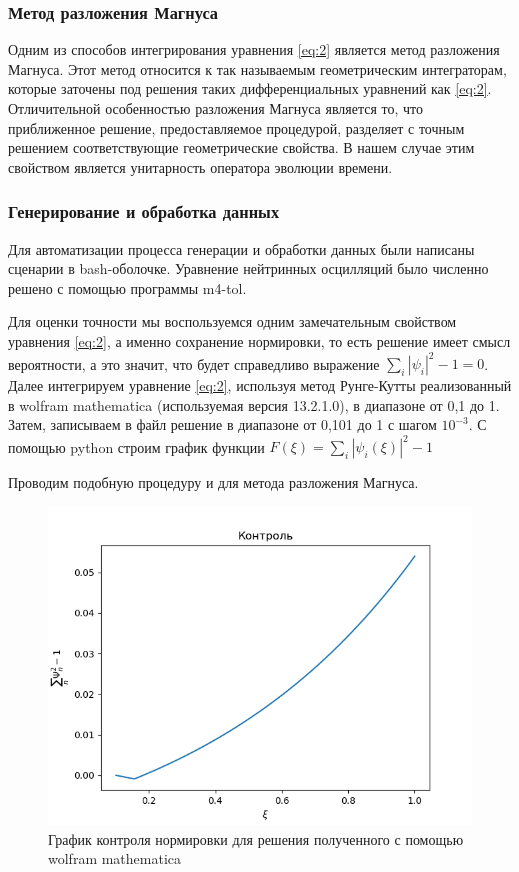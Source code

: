 \documentclass[utf8,9pt,mathserif,usepdftitle=false]{beamer}
\begin{document}
\begin{frame}
	\frametitle{Метод разложения Магнуса}
	Одним из способов интегрирования уравнения \eqref{eq:2} является метод разложения Магнуса. Этот метод относится к так называемым геометрическим интеграторам, которые заточены под решения таких дифференциальных уравнений как \eqref{eq:2}. Отличительной особенностью разложения Магнуса является то, что приближенное решение, предоставляемое процедурой, разделяет с точным решением соответствующие геометрические свойства. В нашем случае этим свойством является унитарность оператора эволюции времени. 
\end{frame}

\begin{frame}
	\frametitle{Генерирование и обработка данных}
	Для автоматизации процесса генерации и обработки данных были написаны сценарии в bash-оболочке. Уравнение нейтринных осцилляций было численно решено с помощью программы m4-tol. 
	
	Для оценки точности мы воспользуемся одним замечательным свойством уравнения \eqref{eq:2}, а именно сохранение нормировки, то есть решение имеет смысл вероятности, а это значит, что будет справедливо выражение \(\sum_{i}|\psi_{i}|^{2}-1=0\). Далее интегрируем уравнение \eqref{eq:2}, используя метод Рунге-Кутты реализованный в wolfram mathematica (используемая версия 13.2.1.0), в диапазоне от 0,1 до 1. Затем, записываем в файл решение в диапазоне от 0,101 до 1 с шагом \(10^{-3}\). С помощью python строим график функции \(F(\xi)=\sum_{i}|\psi_{i}(\xi)|^{2}-1\)
	
	Проводим подобную процедуру и для метода разложения Магнуса.
\end{frame}

\begin{frame}
		\begin{figure}[h]
		
		\centering	
		\includegraphics[width=0.8\linewidth]{контроль_м}
		\caption{График контроля нормировки для решения полученного с помощью wolfram mathematica}
		
	\end{figure}
\end{frame}
\end{document}
